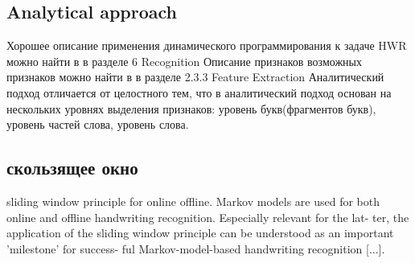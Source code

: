 \subsection{Analytical approach} \label{subsect5_2_2}

Хорошее описание применения динамического программирования к задаче HWR можно найти в \cite{kim1997lexicon} в разделе 6 Recognition
Описание признаков возможных признаков можно найти в \cite{vinciarelli2003offline} в разделе 2.3.3 Feature Extraction
Аналитический подход отличается от целостного тем, что в аналитический подход основан на нескольких уровнях выделения признаков: уровень букв(фрагментов букв), уровень частей слова, уровень слова.


\subsection{скользящее окно} \label{subsect5_2_3}

sliding window principle for online offline. Markov models are used for both online and offline handwriting recognition. Especially relevant for the lat- ter, the application of the sliding window principle can be understood as an important ’milestone’ for success- ful Markov-model-based handwriting recognition [...].\cite{plotz2009markov}



